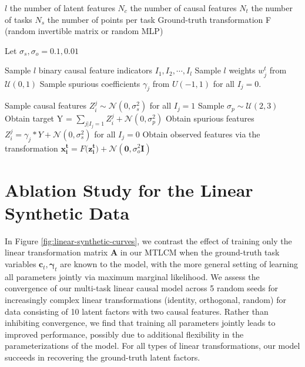 \documentclass{article} %
\theoremstyle{plain}
\theoremstyle{definition}
\theoremstyle{remark}
\begin{document}
\begin{algorithm} 
    \begin{algorithmic}
        \REQUIRE $l$ the number of latent features
        \REQUIRE $N_c$ the number of causal features
        \REQUIRE $N_t$ the number of tasks
        \REQUIRE $N_s$ the number of points per task
        \REQUIRE Ground-truth transformation F (random invertible matrix or random MLP)

        \STATE Let $\sigma_s, \sigma_o = 0.1, 0.01$
        
	    \STATE Sample $l$ binary causal feature indicators $I_1, I_2, \cdots, I_l$
        \STATE Sample $l$ weights $w_j^t$ from $\mathcal{U}(0,1)$
        \STATE Sample spurious coefficients $\gamma_j$ from $U(-1, 1)$ for all $I_j=0$.
        
        
        \STATE Sample causal features $Z_i^j \sim \mathcal{N}(0, \sigma_s^2)$ for all $I_j = 1$
        \STATE Sample $\sigma_p \sim \mathcal{U}(2, 3)$ 
	\STATE Obtain target Y = $\sum_{j | I_j = 1} Z_i^j + \mathcal{N}(0, \sigma_p^2)$
	\STATE Obtain spurious features $Z_i^j = \gamma_j * Y+\mathcal{N}(0,\sigma_s^2)$ for all $I_j = 0$
        \STATE Obtain observed features via the transformation $\mathbf{x_i^t} = F(\mathbf{z_i^t)} + \mathcal{N}(\mathbf{0},\sigma_o^2\mathbf{I})$
        \ENDFOR
        \ENDFOR
    \end{algorithmic}
    \caption{Pseudocode for the data generating process in the synthetic data experiments}
    \label{alg:data-gen}
\end{algorithm}


\section{Ablation Study for the Linear Synthetic Data}\label{appendix:ablation study lin syn}

In Figure \ref{fig:linear-synthetic-curves}, we contrast the 
effect of training only the linear transformation matrix $\mathbf{A}$ in our MTLCM when the ground-truth task variables $\mathbf{c}_t,\boldsymbol{\gamma}_t$ are known to the model, with the more general setting of learning all parameters jointly via maximum marginal likelihood. We assess the convergence of our multi-task linear causal model across 5 random seeds for increasingly complex 
linear transformations (identity, orthogonal, random) for data consisting of 10 latent factors with two causal features. Rather than
inhibiting convergence, we find that training all parameters jointly leads to improved performance, possibly due to additional flexibility in the parameterizations of the model. For all types of linear transformations, our model succeeds in recovering the ground-truth latent factors.
\end{document}
